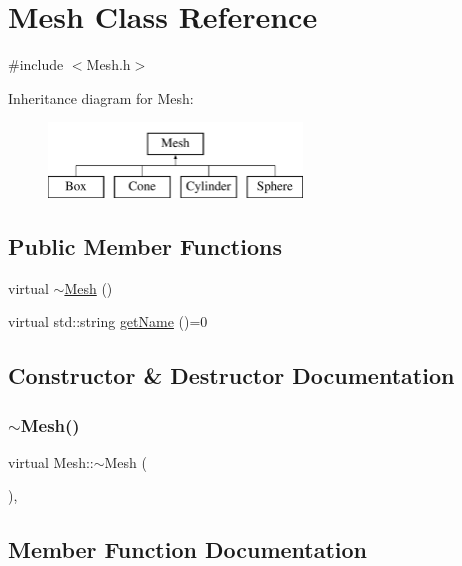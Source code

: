 \hypertarget{class_mesh}{}\section{Mesh Class Reference}
\label{class_mesh}


{\ttfamily \#include $<$Mesh.\+h$>$}

Inheritance diagram for Mesh\+:\begin{figure}[H]
\begin{center}
\leavevmode
\includegraphics[height=2.000000cm]{class_mesh}
\end{center}
\end{figure}
\subsection*{Public Member Functions}
\begin{DoxyCompactItemize}
\item 
virtual \mbox{\hyperlink{class_mesh_ad6a041191ed55c693254e945ce2869ff}{$\sim$\+Mesh}} ()
\item 
virtual std\+::string \mbox{\hyperlink{class_mesh_aa131fe1c2586fe60988155db77c57272}{get\+Name}} ()=0
\end{DoxyCompactItemize}


\subsection{Constructor \& Destructor Documentation}
\mbox{\label{class_mesh_ad6a041191ed55c693254e945ce2869ff}} 
\subsubsection{\texorpdfstring{$\sim$Mesh()}{~Mesh()}}
{\footnotesize\ttfamily virtual Mesh\+::$\sim$\+Mesh (\begin{DoxyParamCaption}{ }\end{DoxyParamCaption})\hspace{0.3cm}{\ttfamily [inline]}, {\ttfamily [virtual]}}



\subsection{Member Function Documentation}
\mbox{\label{class_mesh_aa131fe1c2586fe60988155db77c57272}} 
